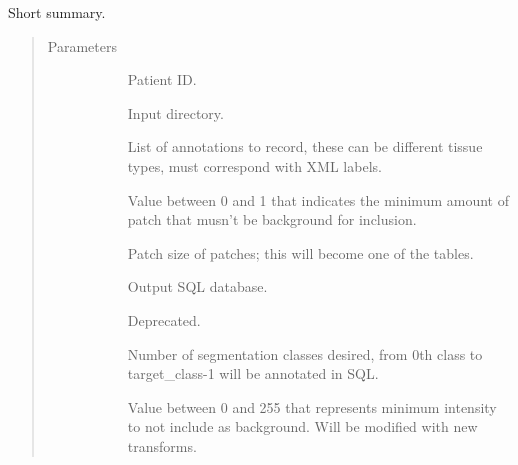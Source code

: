 \documentclass[letterpaper,10pt,english]{sphinxmanual}
\begin{document}

\begin{fulllineitems}
\label{\detokenize{index:pathflowai.utils.generate_patch_pipeline}}
Short summary.
\begin{quote}\begin{description}
\item[{Parameters}] \leavevmode\begin{description}
\item[{}] \leavevmode
Patient ID.

\item[{}] \leavevmode
Input directory.

\item[{}] \leavevmode
List of annotations to record, these can be different tissue types, must correspond with XML labels.

\item[{}] \leavevmode
Value between 0 and 1 that indicates the minimum amount of patch that musn’t be background for inclusion.

\item[{}] \leavevmode
Patch size of patches; this will become one of the tables.

\item[{}] \leavevmode
Output SQL database.

\item[{}] \leavevmode
Deprecated.

\item[{}] \leavevmode
Number of segmentation classes desired, from 0th class to target\_class-1 will be annotated in SQL.

\item[{}] \leavevmode
Value between 0 and 255 that represents minimum intensity to not include as background. Will be modified with new transforms.


\end{description}
\end{description}
\end{quote}
\end{fulllineitems}
\end{document}
